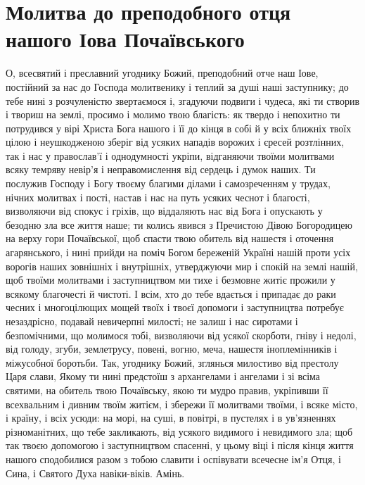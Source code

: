 \documentclass[chapters.tex]{subfiles}
\begin{document}
\section{Молитва до преподобного отця нашого Іова Почаївського}
О, всесвятий і преславний угоднику Божий, преподобний отче наш Іове, постійний за нас до Господа молитвенику і теплий за душі наші заступнику; до тебе нині з розчуленістю звертаємося і, згадуючи подвиги і чудеса, які ти створив і твориш на землі, просимо і молимо твою благість: як твердо і непохитно ти потрудився у вірі Христа Бога нашого і її до кінця в собі й у всіх ближніх твоїх цілою і неушкодженою зберіг від усяких нападів ворожих і єресей розтлінних, так і нас у православ’ї і однодумності укріпи, відганяючи твоїми молитвами всяку темряву невір’я і неправомислення від сердець і думок наших. Ти послужив Господу і Богу твоєму благими ділами і самозреченням у трудах, нічних молитвах і пості, настав і нас на путь усяких чеснот і благості, визволяючи від спокус і гріхів, що віддаляють нас від Бога і опускають у безодню зла все життя наше; ти колись явився з Пречистою Дівою Богородицею на верху гори Почаївської, щоб спасти твою обитель від нашестя і оточення агарянського, і нині прийди на поміч Богом береженій Україні нашій проти усіх ворогів наших зовнішніх і внутрішніх, утверджуючи мир і спокій на землі нашій, щоб твоїми молитвами і заступництвом ми тихе і безмовне житіє прожили у всякому благочесті й чистоті. І всім, хто до тебе вдається і припадає до раки чесних і многоцілющих мощей твоїх і твоєї допомоги і заступництва потребує незаздрісно, подавай невичерпні милості; не залиш і нас сиротами і безпомічними, що молимося тобі, визволяючи від усякої скорботи, гніву і недолі, від голоду, згуби, землетрусу, повені, вогню, меча, нашестя іноплемінників і міжусобної боротьби. Так, угоднику Божий, зглянься милостиво від престолу Царя слави, Якому ти нині предстоїш з архангелами і ангелами і зі всіма святими, на обитель твою Почаївську, якою ти мудро правив, укріпивши її всехвальним і дивним твоїм житієм, і збережи її молитвами твоїми, і всяке місто, і країну, і всіх усюди: на морі, на суші, в повітрі, в пустелях і в ув’язненнях різноманітних, що тебе закликають, від усякого видимого і невидимого зла; щоб так твоєю допомогою і заступництвом спасенні, у цьому віці і після кінця життя нашого сподобилися разом з тобою славити і оспівувати всечесне ім’я Отця, і Сина, і Святого Духа навіки-віків. Амінь.
\end{document}
